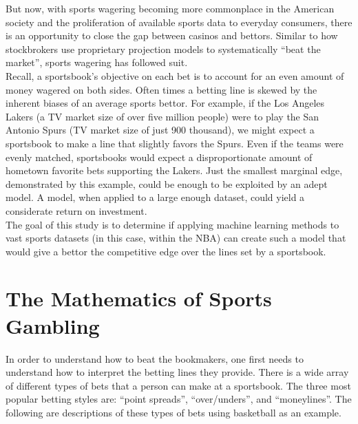 \documentclass [MS] {uclathes}
\begin{document}
\noindent But now, with sports wagering becoming more commonplace in the American society and the proliferation of available sports data to everyday consumers, there is an opportunity to close the gap between casinos and bettors. Similar to how stockbrokers use proprietary projection models to systematically ``beat the market'', sports wagering has followed suit. \\

\noindent Recall, a sportsbook's objective on each bet is to account for an even amount of money wagered on both sides. Often times a betting line is skewed by the inherent biases of an average sports bettor. For example, if the Los Angeles Lakers (a TV market size of over five million people) were to play the San Antonio Spurs (TV market size of just 900 thousand), we might expect a sportsbook to make a line that slightly favors the Spurs. Even if the teams were evenly matched, sportsbooks would expect a disproportionate amount of hometown favorite bets supporting the Lakers. Just the smallest marginal edge, demonstrated by this example, could be enough to be exploited by an adept model. A model, when applied to a large enough dataset, could yield a considerate return on investment. \\

\noindent The goal of this study is to determine if applying machine learning methods to vast sports datasets (in this case, within the NBA) can create such a model that would give a bettor the competitive edge over the lines set by a sportsbook. \\


\chapter{The Mathematics of Sports Gambling}

\noindent In order to understand how to beat the bookmakers, one first needs to understand how to interpret the betting lines they provide. There is a wide array of different types of bets that a person can make at a sportsbook. The three most popular betting styles are: ``point spreads'', ``over/unders'', and ``moneylines''. The following are descriptions of these types of bets using basketball as an example.\\
\end{document}
